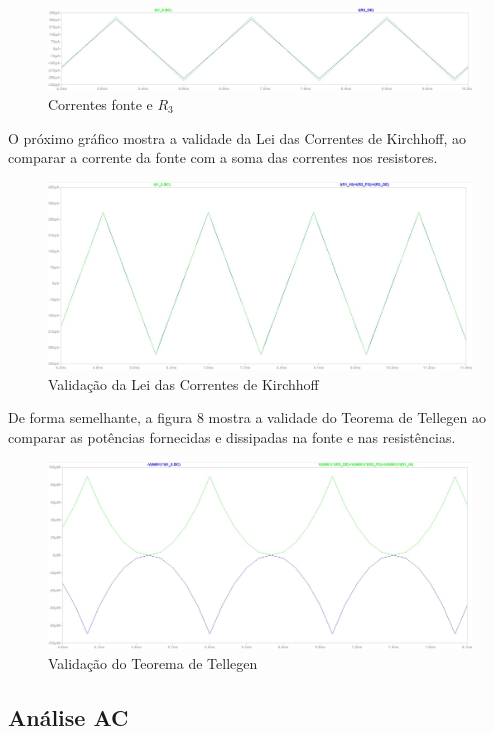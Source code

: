 \documentclass[10pt,twocolumn,letterpaper]{article}
\begin{document}
\begin{figure}[h]
\caption{Correntes fonte e $R_3$}
\includegraphics[scale=0.14]{figuras/fig6}
\end{figure}

O próximo gráfico mostra a validade da Lei das Correntes de Kirchhoff, ao comparar a corrente da fonte com a soma das correntes nos resistores.

\begin{figure}[h]
\caption{Validação da Lei das Correntes de Kirchhoff}
\includegraphics[scale=0.15]{figuras/fig7}
\end{figure}

De forma semelhante, a figura 8 mostra a validade do Teorema de Tellegen ao comparar as potências fornecidas e dissipadas na fonte e nas resistências.

\begin{figure}[h]
\caption{Validação do Teorema de Tellegen}
\includegraphics[scale=0.15]{figuras/fig8}
\end{figure}

\subsection{Análise AC}
\end{document}
